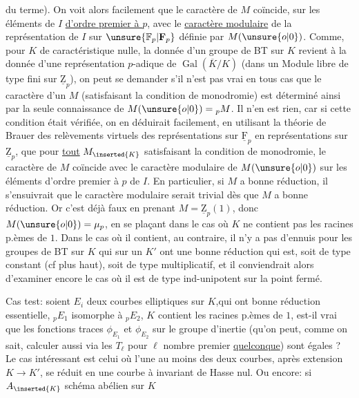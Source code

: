 du terme). On voit alors facilement que le caractère de $M$ coïncide, sur les éléments de $I$ \uline{d'ordre premier à $p$}, avec le \uline{caractère modulaire} de la représentation de $I$  sur $\unsure{\mathbb F_p|\mathbf F_p}$ définie par $M(\unsure{o|0})$. Comme, pour $K$ de caractéristique nulle, la donnée d'un groupe de BT sur $K$ revient à la donnée d'une représentation $p$-adique de $\operatorname{Gal}(\overline K/K)$ (dans un Module libre de type fini sur $\underline{\mathrm Z}_p$), on peut se demander  s'il n'est pas vrai en tous cas que le caractère d'un $M$ (satisfaisant la condition de monodromie) est déterminé ainsi par la seule connaissance de $M(\unsure{o|0})={}_pM$. Il n'en est rien, car si cette condition était vérifiée, on en déduirait facilement, en utilisant la théorie de Brauer des relèvements virtuels des représentations sur $\underline{\mathrm F}_p$ en représentations sur  $\underline{\mathrm Z}_p$, que pour \uline{tout} $M_{\inserted{K}}$ satisfaisant la condition de monodromie, le caractère de $M$ coïncide avec le caractère modulaire de $M(\unsure{o|0})$ sur les éléments d'ordre premier à $p$ de $I$. En particulier, si $M$ a bonne réduction, il s'ensuivrait que le caractère modulaire  serait trivial dès que $M$ a bonne réduction. Or c'est déjà faux en prenant $M=\underline{\mathrm Z}_p(1)$, donc $M(\unsure{o|0})=\mu_p$,  en se plaçant dans le cas où $K$ ne contient pas les racines p.èmes de $1$. Dans le cas où il  contient, au contraire, il n'y a pas d'ennuis pour les groupes de BT sur $K$ qui sur un $K'$ ont une bonne réduction qui est, soit de type constant (cf plus haut), soit de type multiplicatif, et il conviendrait alors d'examiner encore le cas où il est de type ind-unipotent sur la  point fermé.


Cas test: soient $E_i$ deux courbes elliptiques sur $K$,qui ont bonne réduction essentielle, ${}_pE_1$ isomorphe à ${}_pE_2$, $K$ contient les racines p.èmes de $1$, est-il vrai que les fonctions traces $\phi_{E_1}$ et $\phi_{E_2}$ sur le groupe d'inertie (qu'on peut, comme on sait, calculer aussi via les $T_\ell$ pour $\ell$ nombre premier \uline{quelconque}) sont égales ? Le  cas intéressant est celui où l'une au moins des deux courbes, après extension $K\longrightarrow K'$, se réduit en une courbe à invariant de Hasse nul. Ou encore: si $A_{\inserted{K}}$ schéma abélien sur $K$
